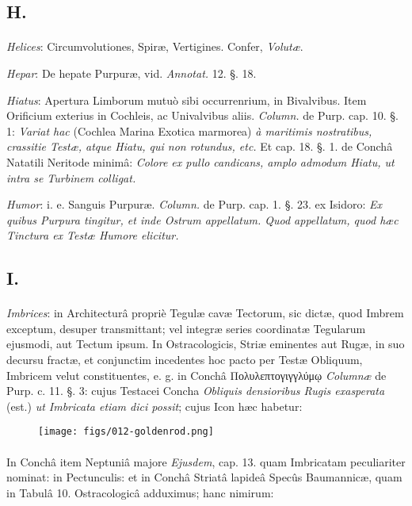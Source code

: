 \documentclass[a4paper, 11pt, oneside, polutonikogreek, german]{article}
\begin{document}
\subsection{H.}
\paragraph{}
\emph{Helices}: Circumvolutiones, Spiræ, Vertigines. Confer, \emph{Volutæ}.

\emph{Hepar}: De hepate Purpuræ, vid. \emph{Annotat.} 12. §. 18.

\emph{Hiatus}: Apertura Limborum mutuò sibi occurrenrium, in Bivalvibus. Item Orificium exterius in Cochleis, ac Univalvibus aliis. \emph{Column.} de Purp. cap. 10. §. 1: \emph{Variat hac} (Cochlea Marina Exotica marmorea) \emph{à maritimis nostratibus, crassitie Testæ, atque Hiatu, qui non rotundus, etc.} Et cap. 18. §. 1. de Conchâ Natatili Neritode minimâ: \emph{Colore ex pullo candicans, amplo admodum Hiatu, ut intra se Turbinem colligat.}

\emph{Humor}: i. e. Sanguis Purpuræ. \emph{Column.} de Purp. cap. 1. §. 23. ex Isidoro: \emph{Ex quibus Purpura tingitur, et inde Ostrum appellatum. Quod appellatum, quod hæc Tinctura ex Testæ Humore elicitur.}

\subsection{I.}
\paragraph{}
\emph{Imbrices}: in Architecturâ propriè Tegulæ cavæ Tectorum, sic dictæ, quod Imbrem exceptum, desuper transmittant; vel integræ series coordinatæ Tegularum ejusmodi, aut Tectum ipsum. In Ostracologicis, Striæ eminentes aut Rugæ, in suo decursu fractæ, et conjunctim incedentes hoc pacto per Testæ Obliquum, Imbricem velut constituentes, e. g. in Conchâ Πολυλεπτογιγγλύμῳ \emph{Columnæ} de Purp. c. 11. §. 3: cujus Testacei Concha \emph{Obliquis densioribus Rugis exasperata} (est.) \emph{ut Imbricata etiam dici possit}; cujus Icon hæc habetur:

\begin{figure}[H]
\centering
\texttt{[image: figs/012-goldenrod.png]}
\end{figure}
\paragraph{}
In Conchâ item Neptuniâ majore \emph{Ejusdem}, cap. 13. quam Imbricatam peculiariter nominat: in Pectunculis: et in Conchâ Striatâ lapideâ Specûs Baumannicæ, quam in Tabulâ 10. Ostracologicâ adduximus; hanc nimirum:
\end{document}
